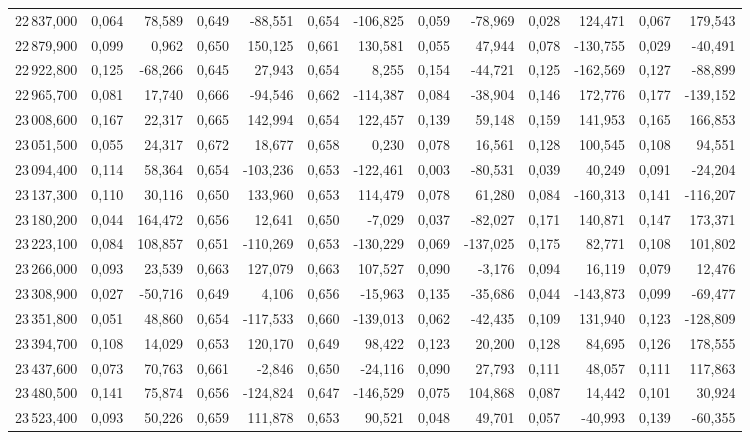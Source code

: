 \begin{longtable}{rrrrrrrrrrrrr}
22\,837,000 & 0,064 & 78,589 & 0,649 & -88,551 & 0,654 & -106,825 & 0,059 & -78,969 & 0,028 & 124,471 & 0,067 & 179,543\\
22\,879,900 & 0,099 & 0,962 & 0,650 & 150,125 & 0,661 & 130,581 & 0,055 & 47,944 & 0,078 & -130,755 & 0,029 & -40,491\\
22\,922,800 & 0,125 & -68,266 & 0,645 & 27,943 & 0,654 & 8,255 & 0,154 & -44,721 & 0,125 & -162,569 & 0,127 & -88,899\\
22\,965,700 & 0,081 & 17,740 & 0,666 & -94,546 & 0,662 & -114,387 & 0,084 & -38,904 & 0,146 & 172,776 & 0,177 & -139,152\\
23\,008,600 & 0,167 & 22,317 & 0,665 & 142,994 & 0,654 & 122,457 & 0,139 & 59,148 & 0,159 & 141,953 & 0,165 & 166,853\\
23\,051,500 & 0,055 & 24,317 & 0,672 & 18,677 & 0,658 & 0,230 & 0,078 & 16,561 & 0,128 & 100,545 & 0,108 & 94,551\\
23\,094,400 & 0,114 & 58,364 & 0,654 & -103,236 & 0,653 & -122,461 & 0,003 & -80,531 & 0,039 & 40,249 & 0,091 & -24,204\\
23\,137,300 & 0,110 & 30,116 & 0,650 & 133,960 & 0,653 & 114,479 & 0,078 & 61,280 & 0,084 & -160,313 & 0,141 & -116,207\\
23\,180,200 & 0,044 & 164,472 & 0,656 & 12,641 & 0,650 & -7,029 & 0,037 & -82,027 & 0,171 & 140,871 & 0,147 & 173,371\\
23\,223,100 & 0,084 & 108,857 & 0,651 & -110,269 & 0,653 & -130,229 & 0,069 & -137,025 & 0,175 & 82,771 & 0,108 & 101,802\\
23\,266,000 & 0,093 & 23,539 & 0,663 & 127,079 & 0,663 & 107,527 & 0,090 & -3,176 & 0,094 & 16,119 & 0,079 & 12,476\\
23\,308,900 & 0,027 & -50,716 & 0,649 & 4,106 & 0,656 & -15,963 & 0,135 & -35,686 & 0,044 & -143,873 & 0,099 & -69,477\\
23\,351,800 & 0,051 & 48,860 & 0,654 & -117,533 & 0,660 & -139,013 & 0,062 & -42,435 & 0,109 & 131,940 & 0,123 & -128,809\\
23\,394,700 & 0,108 & 14,029 & 0,653 & 120,170 & 0,649 & 98,422 & 0,123 & 20,200 & 0,128 & 84,695 & 0,126 & 178,555\\
23\,437,600 & 0,073 & 70,763 & 0,661 & -2,846 & 0,650 & -24,116 & 0,090 & 27,793 & 0,111 & 48,057 & 0,111 & 117,863\\
23\,480,500 & 0,141 & 75,874 & 0,656 & -124,824 & 0,647 & -146,529 & 0,075 & 104,868 & 0,087 & 14,442 & 0,101 & 30,924\\
23\,523,400 & 0,093 & 50,226 & 0,659 & 111,878 & 0,653 & 90,521 & 0,048 & 49,701 & 0,057 & -40,993 & 0,139 & -60,355\\

\end{longtable}
